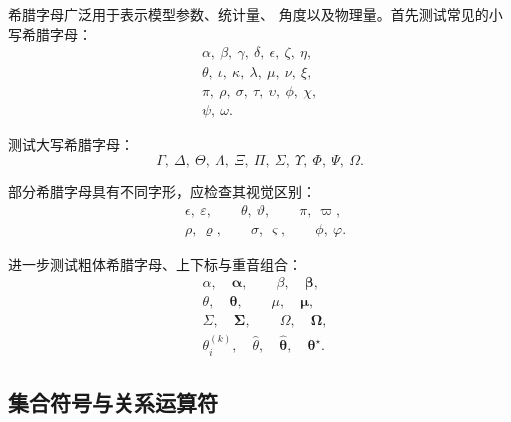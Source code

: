 希腊字母广泛用于表示模型参数、统计量、
角度以及物理量。首先测试常见的小写希腊字母：
\begin{equation}
  \begin{gathered}
    \alpha,\ \beta,\ \gamma,\ \delta,\ \epsilon,\ \zeta,\ \eta,\\
    \theta,\ \iota,\ \kappa,\ \lambda,\ \mu,\ \nu,\ \xi,\\
    \pi,\ \rho,\ \sigma,\ \tau,\ \upsilon,\ \phi,\ \chi,\\
    \psi,\ \omega.
  \end{gathered}
\end{equation}

测试大写希腊字母：
\begin{equation}
  \Gamma,\ \Delta,\ \Theta,\ \Lambda,\ \Xi,\ \Pi,\ 
  \Sigma,\ \Upsilon,\ \Phi,\ \Psi,\ \Omega.
\end{equation}

部分希腊字母具有不同字形，应检查其视觉区别：
\begin{equation}
  \label{eq:test-symbol-greek-variant}
  \begin{aligned}
    &\epsilon,\ \varepsilon,\qquad
     \theta,\ \vartheta,\qquad
     \pi,\ \varpi,\\
    &\rho,\ \varrho,\qquad
     \sigma,\ \varsigma,\qquad
     \phi,\ \varphi.
  \end{aligned}
\end{equation}

进一步测试粗体希腊字母、上下标与重音组合：
\begin{equation}
  \label{eq:test-symbol-bold-greek}
  \begin{aligned}
    &\alpha,\quad \boldsymbol{\alpha},\qquad
     \beta,\quad \boldsymbol{\beta},\\
    &\theta,\quad \boldsymbol{\theta},\qquad
     \mu,\quad \boldsymbol{\mu},\\
    &\Sigma,\quad \boldsymbol{\Sigma},\qquad
     \Omega,\quad \boldsymbol{\Omega},\\
    &\theta_i^{(k)},\quad
     \hat{\theta},\quad
     \widehat{\boldsymbol{\theta}},\quad
     \boldsymbol{\theta}^{\star}.
  \end{aligned}
\end{equation}

\subsection{集合符号与关系运算符}
\label{subsec:symbol-relations}

